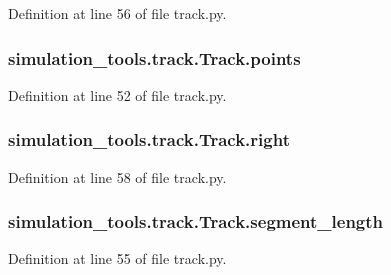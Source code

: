 Definition at line 56 of file track.\+py.

\subsubsection[{\texorpdfstring{points}{points}}]{\setlength{\rightskip}{0pt plus 5cm}simulation\+\_\+tools.\+track.\+Track.\+points}\hypertarget{classsimulation__tools_1_1track_1_1_track_ac6de34747fd382897e7f790cd9faf67c}{}\label{classsimulation__tools_1_1track_1_1_track_ac6de34747fd382897e7f790cd9faf67c}


Definition at line 52 of file track.\+py.

\subsubsection[{\texorpdfstring{right}{right}}]{\setlength{\rightskip}{0pt plus 5cm}simulation\+\_\+tools.\+track.\+Track.\+right}\hypertarget{classsimulation__tools_1_1track_1_1_track_a668e3804fa2720790fb57f592c73c782}{}\label{classsimulation__tools_1_1track_1_1_track_a668e3804fa2720790fb57f592c73c782}


Definition at line 58 of file track.\+py.

\subsubsection[{\texorpdfstring{segment\+\_\+length}{segment_length}}]{\setlength{\rightskip}{0pt plus 5cm}simulation\+\_\+tools.\+track.\+Track.\+segment\+\_\+length}\hypertarget{classsimulation__tools_1_1track_1_1_track_aa74dadec286ae8ad2f3399c6fd9e9fd9}{}\label{classsimulation__tools_1_1track_1_1_track_aa74dadec286ae8ad2f3399c6fd9e9fd9}


Definition at line 55 of file track.\+py.

